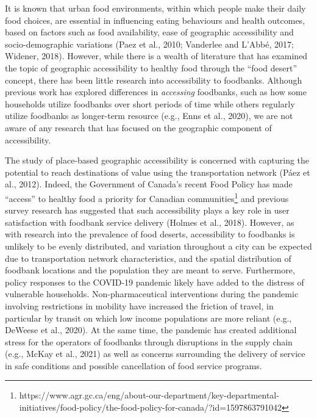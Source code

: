 \documentclass[]{elsarticle} %
\begin{document}
It is known that urban food environments, within which people make their
daily food choices, are essential in influencing eating behaviours and
health outcomes, based on factors such as food availability, ease of
geographic accessibility and socio-demographic variations (Paez et al.,
2010; Vanderlee and L'Abbé, 2017; Widener, 2018). However, while there
is a wealth of literature that has examined the topic of geographic
accessibility to healthy food through the ``food desert'' concept, there
has been little research into accessibility to foodbanks. Although
previous work has explored differences in \emph{accessing} foodbanks,
such as how some households utilize foodbanks over short periods of time
while others regularly utilize foodbanks as longer-term resource (e.g.,
Enns et al., 2020), we are not aware of any research that has focused on
the geographic component of accessibility.

The study of place-based geographic accessibility is concerned with
capturing the potential to reach destinations of value using the
transportation network (Páez et al., 2012). Indeed, the Government of
Canada's recent Food Policy has made ``access'' to healthy food a
priority for Canadian communities\footnote{https://www.agr.gc.ca/eng/about-our-department/key-departmental-initiatives/food-policy/the-food-policy-for-canada/?id=1597863791042}
and previous survey research has suggested that such accessibility plays
a key role in user satisfaction with foodbank service delivery (Holmes
et al., 2018). However, as with research into the prevalence of food
deserts, accessibility to foodbanks is unlikely to be evenly
distributed, and variation throughout a city can be expected due to
transportation network characteristics, and the spatial distribution of
foodbank locations and the population they are meant to serve.
Furthermore, policy responses to the COVID-19 pandemic likely have added
to the distress of vulnerable households. Non-pharmaceutical
interventions during the pandemic involving restrictions in mobility
have increased the friction of travel, in particular by transit on which
low income populations are more reliant (e.g., DeWeese et al., 2020). At
the same time, the pandemic has created additional stress for the
operators of foodbanks through disruptions in the supply chain (e.g.,
McKay et al., 2021) as well as concerns surrounding the delivery of
service in safe conditions and possible cancellation of food service
programs.
\end{document}
